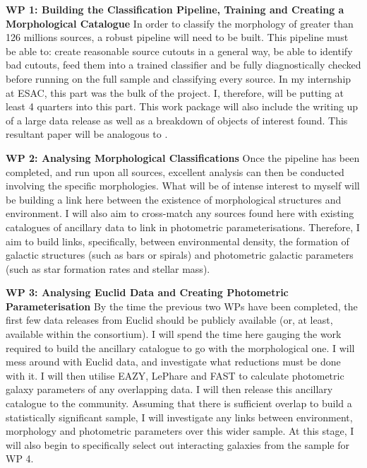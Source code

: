 \documentclass[11pt,usenatbib]{article}
\begin{document}
\noindent \textbf{WP 1: Building the Classification Pipeline, Training and Creating a Morphological Catalogue} In order to classify the morphology of greater than 126 millions sources, a robust pipeline will need to be built. This pipeline must be able to: create reasonable source cutouts in a general way, be able to identify bad cutouts, feed them into a trained classifier and be fully diagnostically checked before running on the full sample and classifying every source. In my internship at ESAC, this part was the bulk of the project. I, therefore, will be putting at least 4 quarters into this part. This work package will also include the writing up of a large data release as well as a breakdown of objects of interest found. This resultant paper will be analogous to \citet{O'Ryan}.

\noindent \textbf{WP 2: Analysing Morphological Classifications} Once the pipeline has been completed, and run upon all sources, excellent analysis can then be conducted involving the specific morphologies. What will be of intense interest to myself will be building a link here between the existence of morphological structures and environment. I will also aim to cross-match any sources found here with existing catalogues of ancillary data to link in photometric parameterisations. Therefore, I aim to build links, specifically, between environmental density, the formation of galactic structures (such as bars or spirals) and photometric galactic parameters (such as star formation rates and stellar mass).

\noindent \textbf{WP 3: Analysing Euclid Data and Creating Photometric Parameterisation} By the time the previous two WPs have been completed, the first few data releases from Euclid should be publicly available (or, at least, available within the consortium). I will spend the time here gauging the work required to build the ancillary catalogue to go with the morphological one. I will mess around with Euclid data, and investigate what reductions must be done with it. I will then utilise EAZY, LePhare and FAST to calculate photometric galaxy parameters of any overlapping data. I will then release this ancillary catalogue to the community. Assuming that there is sufficient overlap to build a statistically significant sample, I will investigate any links between environment, morphology and photometric parameters over this wider sample. At this stage, I will also begin to specifically select out interacting galaxies from the sample for WP 4.
\end{document}
